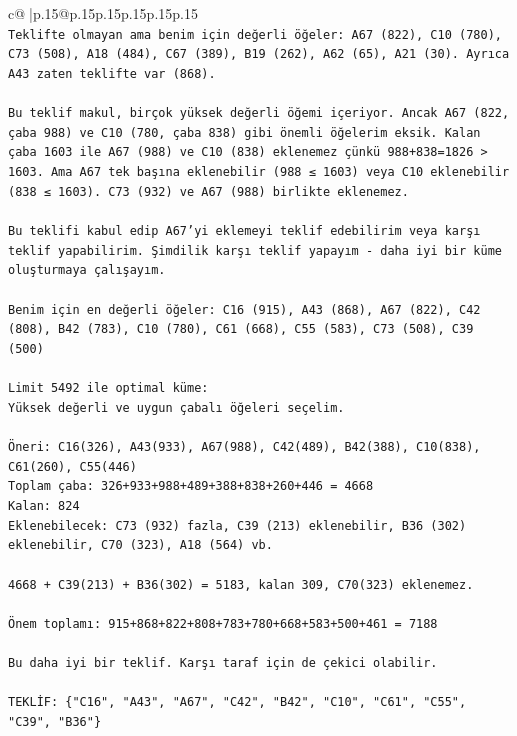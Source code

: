 \documentclass{article}
\begin{document}
{\begin{supertabular}{c@{$\;$}|p{.15\linewidth}@{}p{.15\linewidth}p{.15\linewidth}p{.15\linewidth}p{.15\linewidth}p{.15\linewidth}}
{{{\\ 
\texttt{Teklifte olmayan ama benim için değerli öğeler: A67 (822), C10 (780), C73 (508), A18 (484), C67 (389), B19 (262), A62 (65), A21 (30). Ayrıca A43 zaten teklifte var (868).} \\
\\ 
\texttt{Bu teklif makul, birçok yüksek değerli öğemi içeriyor. Ancak A67 (822, çaba 988) ve C10 (780, çaba 838) gibi önemli öğelerim eksik. Kalan çaba 1603 ile A67 (988) ve C10 (838) eklenemez çünkü 988+838=1826 > 1603. Ama A67 tek başına eklenebilir (988 ≤ 1603) veya C10 eklenebilir (838 ≤ 1603). C73 (932) ve A67 (988) birlikte eklenemez.} \\
\\ 
\texttt{Bu teklifi kabul edip A67'yi eklemeyi teklif edebilirim veya karşı teklif yapabilirim. Şimdilik karşı teklif yapayım {-} daha iyi bir küme oluşturmaya çalışayım.} \\
\\ 
\texttt{Benim için en değerli öğeler: C16 (915), A43 (868), A67 (822), C42 (808), B42 (783), C10 (780), C61 (668), C55 (583), C73 (508), C39 (500)} \\
\\ 
\texttt{Limit 5492 ile optimal küme:} \\
\texttt{Yüksek değerli ve uygun çabalı öğeleri seçelim.} \\
\\ 
\texttt{Öneri: C16(326), A43(933), A67(988), C42(489), B42(388), C10(838), C61(260), C55(446)} \\
\texttt{Toplam çaba: 326+933+988+489+388+838+260+446 = 4668} \\
\texttt{Kalan: 824} \\
\texttt{Eklenebilecek: C73 (932) fazla, C39 (213) eklenebilir, B36 (302) eklenebilir, C70 (323), A18 (564) vb.} \\
\\ 
\texttt{4668 + C39(213) + B36(302) = 5183, kalan 309, C70(323) eklenemez.} \\
\\ 
\texttt{Önem toplamı: 915+868+822+808+783+780+668+583+500+461 = 7188} \\
\\ 
\texttt{Bu daha iyi bir teklif. Karşı taraf için de çekici olabilir.} \\
\\ 
\texttt{TEKLİF: \{"C16", "A43", "A67", "C42", "B42", "C10", "C61", "C55", "C39", "B36"\}} \\
            }
        }
    }
     \\ \\


\end{supertabular}}
\end{document}
